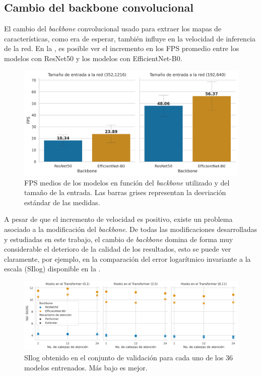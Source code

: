 \subsection{Cambio del backbone convolucional}\label{resultados-cuantitativos-backbone}
El cambio del \textit{backbone} convolucional usado para extraer los mapas de características, como era de esperar, también influye en la velocidad de inferencia de la red. En la , es posible ver el incremento en los FPS promedio entre los modelos con ResNet50 y los modelos con EfficientNet-B0.

\begin{figure}[H]
\centering
\includegraphics[width=0.8\linewidth]{imagenes/Resultados/velocidad_inferencia_backbone.png} 
\captionsetup{width=.8\linewidth}
\caption{FPS medios de los modelos en función del \textit{backbone} utilizado y del tamaño de la entrada. Las barras grises representan la desviación estándar de las medidas.}
\label{fig:resultados-inf-backbone}
\end{figure}

A pesar de que el incremento de velocidad es positivo, existe un problema asociado a la modificación del \textit{backbone}. De todas las modificaciones desarrolladas y estudiadas en este trabajo, el cambio de \textit{backbone} domina de forma muy considerable el deterioro de la calidad de los resultados, esto se puede ver claramente, por ejemplo, en la comparación del error logarítmico invariante a la escala (SIlog) disponible en la .

\begin{figure}[H]
\centering
\includegraphics[width=\linewidth]{imagenes/Resultados/SIlog_val.png} 
\captionsetup{width=.95\linewidth}
\caption{SIlog obtenido en el conjunto de validación para cada uno de los 36 modelos entrenados. Más bajo es mejor.}
\label{fig:SIlog-validation}
\end{figure}

